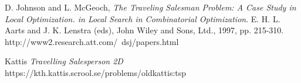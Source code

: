 \documentclass[a4paper,12pt,oneside]{article}
\begin{document}
\begin{thebibliography}{9}

	D. Johnson and L. McGeoch,
	\emph{The Traveling Salesman Problem: A Case Study in Local Optimization. in Local Search in Combinatorial Optimization}.
	E. H. L. Aarts and J. K. Lenstra (eds), John Wiley and Sons, Ltd., 1997, pp. 215-310. http://www2.research.att.com/~dsj/papers.html

	Kattis
	\emph{Travelling Salesperson 2D}
	https://kth.kattis.scrool.se/problems/oldkattis:tsp

\end{thebibliography}
\end{document}
